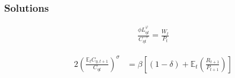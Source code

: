 \documentclass[
	12pt,
	]{article}
\numberwithin{equation}{section}
\theoremstyle{definition}
\theoremstyle{plain}
\theoremstyle{plain}
\theoremstyle{plain}
\begin{document}

\subsubsection*{Solutions}

\begin{align}
	\frac{\phi L_{\eta t}^{\varphi}}{C_{\eta t}^{-\sigma}} = \frac{W_t}{P_t} \label{eq:household-labor-supply}
\end{align}


\begin{alignat}{2}
	\left( \frac{\mathbb{E}_t C_{\eta, t+1}}{C_{\eta t}} \right)^\sigma & = \beta \left[ (1-\delta) + \mathbb{E}_t \left(\frac{R_{t+1}}{P_{t+1}}\right) \right] \label{eq:household-euler-equation}
\end{alignat}

\end{document}
